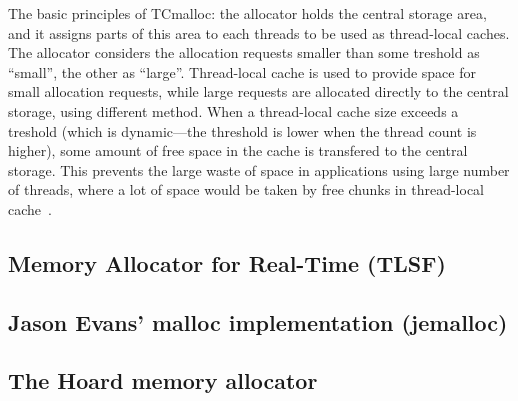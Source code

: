 The basic principles of TCmalloc: the allocator holds the central storage area,
and it assigns parts of this area to each threads to be used as thread-local
caches. The allocator considers the allocation requests smaller than some
treshold as ``small'', the other as ``large''. Thread-local cache is used to
provide space for small allocation requests, while large requests are allocated
directly to the central storage, using different method. When a thread-local
cache size exceeds a treshold (which is dynamic---the threshold is lower when
the thread count is higher), some amount of free space in the cache is
transfered to the central storage. This prevents the large waste of space in
applications using large number of threads, where a lot of space would be taken
by free chunks in thread-local cache~\cite{tcmalloc}.
\subsection{Memory Allocator for Real-Time (TLSF)}
\subsection{Jason Evans' malloc implementation (jemalloc)}
\subsection{The Hoard memory allocator}






